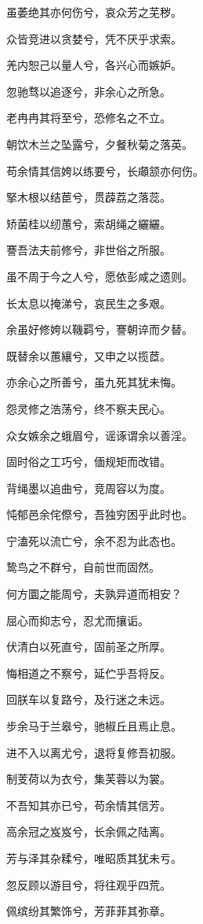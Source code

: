 \documentclass[12pt,a4paper]{ctexbook}
\begin{document}
虽萎绝其亦何伤兮，哀众芳之芜秽。\par
众皆竞进以贪婪兮，凭不厌乎求索。\par
羌内恕己以量人兮，各兴心而嫉妒。\par
忽驰骛以追逐兮，非余心之所急。\par
老冉冉其将至兮，恐修名之不立。\par
朝饮木兰之坠露兮，夕餐秋菊之落英。\par
苟余情其信姱以练要兮，长顑颔亦何伤。\par
掔木根以结茞兮，贯薜荔之落蕊。\par
矫菌桂以纫蕙兮，索胡绳之纚纚。\par
謇吾法夫前修兮，非世俗之所服。\par
虽不周于今之人兮，愿依彭咸之遗则。\par
长太息以掩涕兮，哀民生之多艰。\par
余虽好修姱以鞿羁兮，謇朝谇而夕替。\par
既替余以蕙纕兮，又申之以揽茝。\par
亦余心之所善兮，虽九死其犹未悔。\par
怨灵修之浩荡兮，终不察夫民心。\par
众女嫉余之蛾眉兮，谣诼谓余以善淫。\par
固时俗之工巧兮，偭规矩而改错。\par
背绳墨以追曲兮，竞周容以为度。\par
忳郁邑余侘傺兮，吾独穷困乎此时也。\par
宁溘死以流亡兮，余不忍为此态也。\par
鸷鸟之不群兮，自前世而固然。\par
何方圜之能周兮，夫孰异道而相安？\par
屈心而抑志兮，忍尤而攘诟。\par
伏清白以死直兮，固前圣之所厚。\par
悔相道之不察兮，延伫乎吾将反。\par
回朕车以复路兮，及行迷之未远。\par
步余马于兰皋兮，驰椒丘且焉止息。\par
进不入以离尤兮，退将复修吾初服。\par
制芰荷以为衣兮，集芙蓉以为裳。\par
不吾知其亦已兮，苟余情其信芳。\par
高余冠之岌岌兮，长余佩之陆离。\par
芳与泽其杂糅兮，唯昭质其犹未亏。\par
忽反顾以游目兮，将往观乎四荒。\par
佩缤纷其繁饰兮，芳菲菲其弥章。\par
\end{document}

